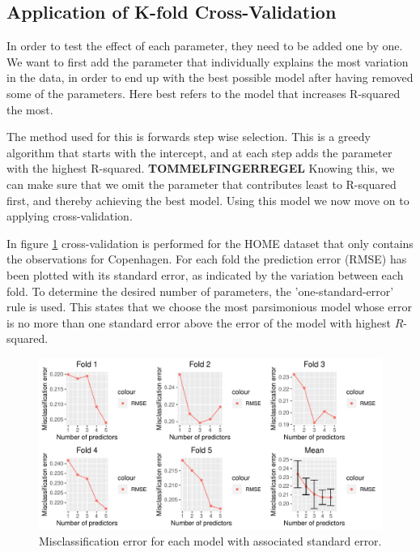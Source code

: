 \subsection{Application of K-fold Cross-Validation}

In order to test the effect of each parameter, they need to be added one by one. 
We want to first add the parameter that individually explains the most variation in the data, in order to end up with the best possible model after having removed some of the parameters.
Here best refers to the model that increases R-squared the most. 

The method used for this is forwards step wise selection. 
This is a greedy algorithm that starts with the intercept, and at each step adds the parameter with the highest R-squared. 
\textbf{TOMMELFINGERREGEL}
Knowing this, we can make sure that we omit the parameter that contributes least to R-squared first, and thereby achieving the best model. 
Using this model we now move on to applying cross-validation. 

In figure \ref{fig:CrossValidationCopenhagen} cross-validation is performed for the HOME dataset that only contains the observations for Copenhagen.
For each fold the prediction error (RMSE) has been plotted with its standard error, as indicated by the variation between each fold. 
To determine the desired number of parameters, the 'one-standard-error' rule is used. This states that we choose the most parsimonious model whose error is no more than one standard error above the error of the model with highest $R$-squared.

    \begin{figure}[H]
        \centering
      \includegraphics[width = 1 \textwidth]{figures/CrossValidationCopenhagen.pdf}
      \caption{Misclassification error for each model with associated standard error.}
      \label{fig:CrossValidationCopenhagen}
    \end{figure}
    
